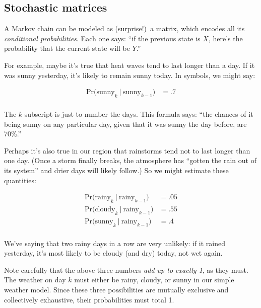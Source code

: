 \begin{alttitles}
\subsection{Stochastic matrices}

A Markov chain can be modeled as (surprise!)~a matrix, which encodes all its
\textit{conditional probabilities}. Each one says: ``if the previous state is
$X$, here's the probability that the current state will be $Y$.''

For example, maybe it's true that heat waves tend to last longer than a day. If
it was sunny yesterday, it's likely to remain sunny today. In symbols, we might
say:

\vspace{-.15in}
\begin{align*}
\textrm{Pr(sunny}_k\ |\ \textrm{sunny}_{k-1}) &= .7 \\
\end{align*}
\vspace{-.25in}

The $k$ subscript is just to number the days. This formula says: ``the chances
of it being sunny on any particular day, given that it was sunny the day
before, are 70\%.''

\smallskip

Perhaps it's also true in our region that rainstorms tend not to last longer
than one day. (Once a storm finally breaks, the atmosphere has ``gotten the
rain out of its system'' and drier days will likely follow.) So we might
estimate these quantities:

\vspace{-.15in}
\begin{align*}
\textrm{Pr(rainy}_k\ |\ \textrm{rainy}_{k-1}) &= .05 \\
\textrm{Pr(cloudy}_k\ |\ \textrm{rainy}_{k-1}) &= .55 \\
\textrm{Pr(sunny}_k\ |\ \textrm{rainy}_{k-1}) &= .4 \\
\end{align*}
\vspace{-.25in}

We've saying that two rainy days in a row are very unlikely: if it rained
yesterday, it's most likely to be cloudy (and dry) today, not wet again.


Note carefully that the above three numbers \textit{add up to exactly 1}, as
they must. The weather on day $k$ must either be rainy, cloudy, or sunny in our
simple weather model. Since these three possibilities are mutually exclusive
and collectively exhaustive, their probabilities must total 1.


\end{alttitles}
